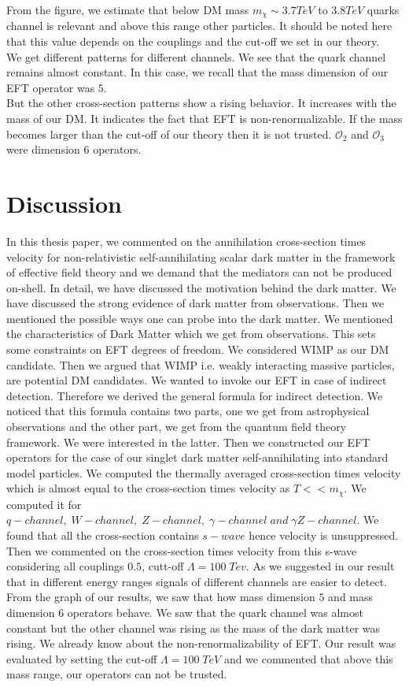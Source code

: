 \documentclass[12pt]{report}
\begin{document}
From the figure, we estimate that below DM mass  $m_\chi \sim 3.7 TeV$ to $3.8 TeV$ quarks channel is relevant and above this range other particles. It should be noted here that this value depends on the couplings and the cut-off we set in our theory.\\
We get different patterns for different channels. We see that the quark channel remains almost constant. In this case, we recall that the mass dimension of our EFT operator was $5$.\\

But the other cross-section patterns show a rising behavior. It increases with the mass of our DM. It indicates the fact that EFT is non-renormalizable. If the mass becomes larger than the cut-off of our theory then it is not trusted. $\mathcal{O}_2$ and $\mathcal{O}_3$ were dimension $6$ operators.


\section{Discussion}
In this thesis paper, we commented on the annihilation cross-section times velocity for non-relativistic self-annihilating scalar dark matter in the framework of effective field theory and we demand that the mediators can not be produced on-shell.
In detail, we have discussed the motivation behind the dark matter. We have discussed the strong evidence of dark matter from observations. Then we mentioned the possible ways one can probe into the dark matter. We mentioned the characteristics of Dark Matter which we get from observations. This sets some constraints on EFT degrees of freedom. We considered WIMP as our DM candidate. Then we argued that WIMP i.e. weakly interacting massive particles, are potential DM candidates. We wanted to invoke our EFT in case of indirect detection. Therefore we derived the general formula for indirect detection. We noticed that this formula contains two parts, one we get from astrophysical observations and the other part, we get from the quantum field theory framework. We were interested in the latter. Then we constructed our EFT operators for the case of our singlet dark matter self-annihilating into standard model particles. We computed the thermally averaged cross-section times velocity which is almost equal to the cross-section times velocity as $T<<m_\chi$. We computed it for $q-channel, \; W-channel,\; Z-channel,\; \gamma-channel\; and\; \gamma Z-channel$. We found that all the cross-section contains $s-wave$ hence velocity is unsuppressed. Then we commented on the cross-section times velocity from this s-wave considering all couplings $0.5$, cutt-off $\Lambda= 100\; Tev$. As we suggested in our result that in different energy ranges signals of different channels are easier to detect.
From the graph of our results, we saw that how mass dimension $5$ and mass dimension $6$ operators behave. We saw that the quark channel was almost constant but the other channel was rising as the mass of the dark matter was rising. We already know about the non-renormalizability of EFT. Our result was evaluated by setting the cut-off $\Lambda=100\; TeV$ and we commented that above this mass range, our operators can not be trusted.
\end{document}

